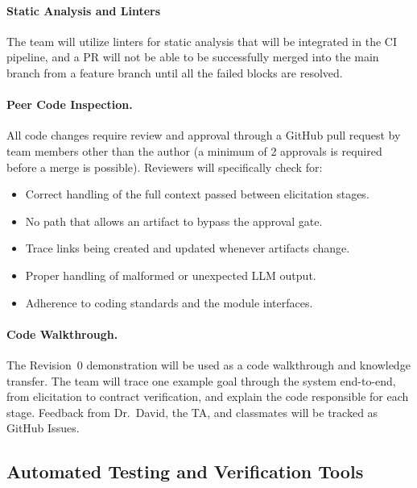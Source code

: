 \documentclass[12pt, titlepage]{article}
\begin{document}
\paragraph{Static Analysis and Linters}
The team will utilize linters for static analysis that will be integrated in the CI pipeline, and a PR will not be able to be successfully merged into the main branch from a feature branch until all the failed blocks are resolved. 

\paragraph{Peer Code Inspection.}
All code changes require review and approval through a GitHub pull request by team members other than the author (a minimum of 2 approvals is required before a merge is possible). Reviewers will
specifically check for:
\begin{itemize}
  \item Correct handling of the full context passed between elicitation
  stages.
  \item No path that allows an artifact to bypass the approval gate.
  \item Trace links being created and updated whenever artifacts change.
  \item Proper handling of malformed or unexpected LLM output.
  \item Adherence to coding standards and the module interfaces.
\end{itemize}

\paragraph{Code Walkthrough.}
The Revision~0 demonstration will be used as a code walkthrough and knowledge transfer. The team will trace one example goal through the system end-to-end, from elicitation to contract verification, and explain the code responsible for each stage. Feedback from Dr.\ David, the TA, and classmates will be tracked as GitHub Issues.

\subsection{Automated Testing and Verification Tools}
\end{document}
